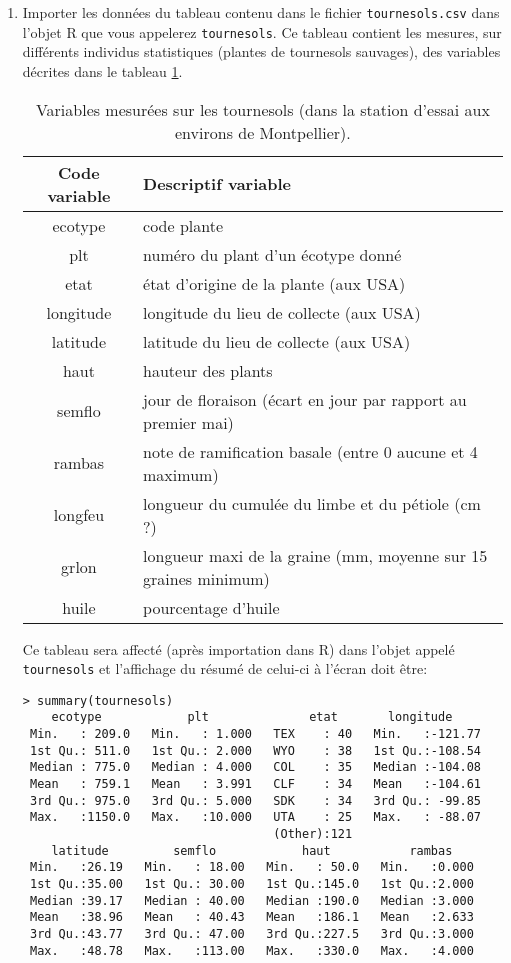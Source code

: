 \documentclass[a4paper,10pt,french]{article}
\begin{document}
\begin{enumerate}
\item Importer les données du tableau contenu dans le fichier \texttt{tournesols.csv} dans  l'objet \textsf{R} que vous appelerez  \texttt{tournesols}. Ce tableau contient les mesures, sur différents individus statistiques (plantes de tournesols sauvages), des variables décrites dans le tableau \ref{tab:variables:plantes}.  
\begin{table}[H]
  \centering
  \begin{tabular}{cl}\hline\hline
Code variable& Descriptif variable\\\hline
    ecotype & code plante \\
plt & numéro du plant d'un écotype donné\\
etat & état d'origine de la plante (aux USA)\\
longitude& longitude du lieu de collecte (aux USA)\\
latitude& latitude du lieu de collecte (aux USA)\\
haut& hauteur des plants\\
semflo& jour de floraison (écart en jour par rapport au premier mai)\\
rambas&note de ramification basale (entre 0 aucune et 4 maximum)\\
longfeu&longueur du cumulée du limbe et du pétiole (cm ?)\\ 
grlon&longueur maxi de la graine (mm, moyenne sur 15 graines minimum)\\
huile&pourcentage d'huile\\\hline
  \end{tabular}
  \caption{Variables mesurées sur les tournesols (dans la station d'essai aux environs de Montpellier).}
  \label{tab:variables:plantes}
\end{table}
Ce tableau sera affecté (après importation dans \textsf{R}) dans l'objet appelé \texttt{tournesols} et l'affichage du résumé de celui-ci à l'écran doit être:
\begin{verbatim}
> summary(tournesols)
    ecotype            plt              etat       longitude      
 Min.   : 209.0   Min.   : 1.000   TEX    : 40   Min.   :-121.77  
 1st Qu.: 511.0   1st Qu.: 2.000   WYO    : 38   1st Qu.:-108.54  
 Median : 775.0   Median : 4.000   COL    : 35   Median :-104.08  
 Mean   : 759.1   Mean   : 3.991   CLF    : 34   Mean   :-104.61  
 3rd Qu.: 975.0   3rd Qu.: 5.000   SDK    : 34   3rd Qu.: -99.85  
 Max.   :1150.0   Max.   :10.000   UTA    : 25   Max.   : -88.07  
                                   (Other):121                    
    latitude         semflo            haut           rambas     
 Min.   :26.19   Min.   : 18.00   Min.   : 50.0   Min.   :0.000  
 1st Qu.:35.00   1st Qu.: 30.00   1st Qu.:145.0   1st Qu.:2.000  
 Median :39.17   Median : 40.00   Median :190.0   Median :3.000  
 Mean   :38.96   Mean   : 40.43   Mean   :186.1   Mean   :2.633  
 3rd Qu.:43.77   3rd Qu.: 47.00   3rd Qu.:227.5   3rd Qu.:3.000  
 Max.   :48.78   Max.   :113.00   Max.   :330.0   Max.   :4.000  
                                                                 

\end{verbatim}
\end{enumerate}
\end{document}
